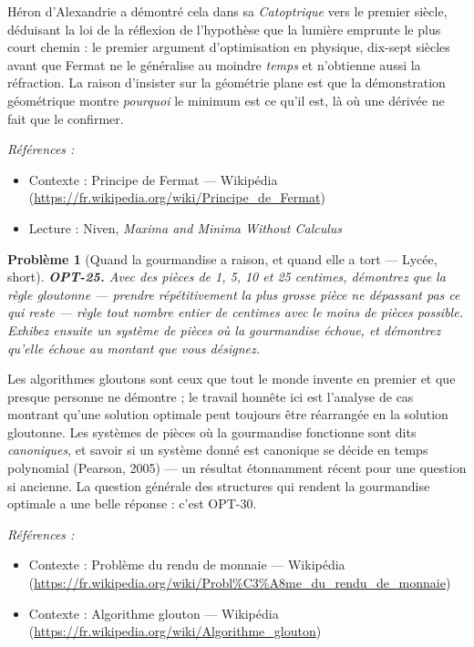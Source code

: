 \documentclass[11pt]{article}
\newtheorem{problem}{Problème}
\newenvironment{refs}{\par\small\noindent\emph{Références :}\begin{itemize}\setlength\itemsep{0pt}}{\end{itemize}\normalsize}
\begin{document}
\noindent Héron d'Alexandrie a démontré cela dans sa \textit{Catoptrique} vers le premier
siècle, déduisant la loi de la réflexion de l'hypothèse que la lumière emprunte le plus court
chemin : le premier argument d'optimisation en physique, dix-sept siècles avant que Fermat ne le
généralise au moindre \textit{temps} et n'obtienne aussi la réfraction. La raison d'insister sur la
géométrie plane est que la démonstration géométrique montre \textit{pourquoi} le minimum est ce
qu'il est, là où une dérivée ne fait que le confirmer.

\begin{refs}
\item Contexte : Principe de Fermat --- Wikipédia (\url{https://fr.wikipedia.org/wiki/Principe_de_Fermat})
\item Lecture : Niven, \textit{Maxima and Minima Without Calculus}
\end{refs}

\bigskip

\begin{problem}[{Quand la gourmandise a raison, et quand elle a tort --- Lycée, short}]
\textbf{OPT-25.} Avec des pièces de 1, 5, 10 et 25 centimes, démontrez que la règle
gloutonne --- prendre répétitivement la plus grosse pièce ne dépassant pas ce qui reste --- règle tout
nombre entier de centimes avec le moins de pièces possible. Exhibez ensuite un système de pièces
où la gourmandise échoue, et démontrez qu'elle échoue au montant que vous désignez.
\end{problem}

\noindent Les algorithmes gloutons sont ceux que tout le monde invente en premier et que
presque personne ne démontre ; le travail honnête ici est l'analyse de cas montrant qu'une solution
optimale peut toujours être réarrangée en la solution gloutonne. Les systèmes de pièces où la
gourmandise fonctionne sont dits \textit{canoniques}, et savoir si un système donné est canonique se
décide en temps polynomial (Pearson, 2005) --- un résultat étonnamment récent pour une question si
ancienne. La question générale des structures qui rendent la gourmandise optimale a une belle
réponse : c'est OPT-30.

\begin{refs}
\item Contexte : Problème du rendu de monnaie --- Wikipédia (\url{https://fr.wikipedia.org/wiki/Probl%C3%A8me_du_rendu_de_monnaie})
\item Contexte : Algorithme glouton --- Wikipédia (\url{https://fr.wikipedia.org/wiki/Algorithme_glouton})
\end{refs}
\end{document}
